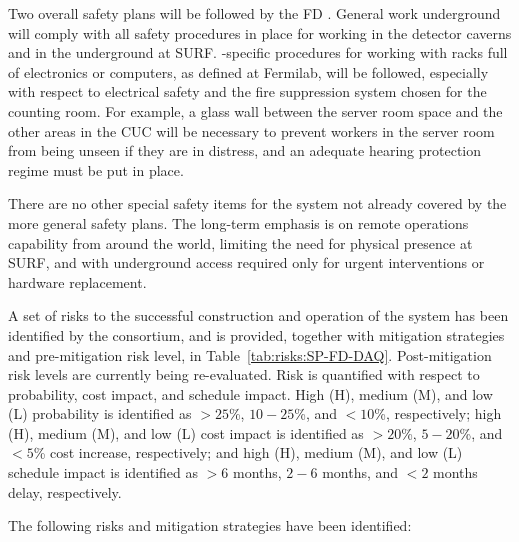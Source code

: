 Two overall safety plans will be followed by the FD . General work underground will comply
with all safety procedures in place for working in the detector
caverns and in the  underground at
SURF. -specific procedures for working with racks full of
electronics or computers, as defined 
at Fermilab, will be followed, especially with respect to electrical safety and the fire suppression
system chosen for the counting room. For example, a glass wall between the server room space and
the other areas in the CUC will be necessary to prevent workers in the server room from being
unseen if they are in distress, and an adequate hearing protection
regime must be put in place.

There are no other special safety items for the  system not already covered by the more general safety plans. The long-term emphasis is on remote operations capability from around the world, limiting the need for physical presence at SURF, and with underground access required only for urgent interventions or hardware replacement. 

A set of risks to the successful construction and operation of the  system has been
identified by the consortium, and is provided,
together with mitigation strategies and pre-mitigation risk level, 
in Table~\ref{tab:risks:SP-FD-DAQ}. Post-mitigation risk levels are
currently being re-evaluated. Risk is quantified with respect to
probability, cost impact, and schedule impact. High (H), medium (M), and low (L)
probability is identified as
$>25$\%, $10-25$\%, and $<10$\%, respectively; high (H), medium (M), and low (L)
cost impact is identified as
$>20$\%, $5-20$\%, and $<5$\% cost increase, respectively; and high
(H), medium (M), and low (L) schedule impact is identified as 
$>6$ months, $2-6$ months, and $<2$ months delay, respectively.



The following risks and mitigation strategies have been identified:

